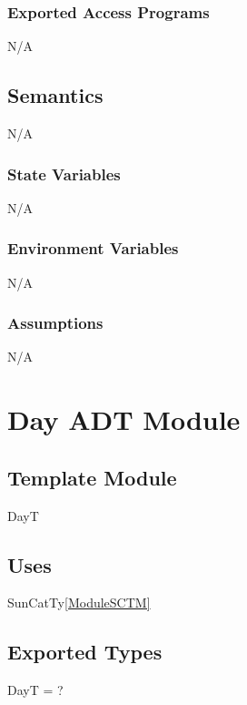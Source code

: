 \documentclass[12pt, titlepage]{article}
\begin{document}
\subsubsection{Exported Access Programs}
N/A\\

\subsection{Semantics}
N/A\\
\subsubsection{State Variables}
N/A\\

\subsubsection{Environment Variables}

N/A\\

\subsubsection{Assumptions}
N/A\\

\newpage


\section{Day ADT Module} \label{ModuleADTD} 

\subsection{Template Module}
DayT

\subsection{Uses}

SunCatTy\ref{ModuleSCTM} \\

\subsection{Exported Types}

DayT = ? \\
\end{document}

